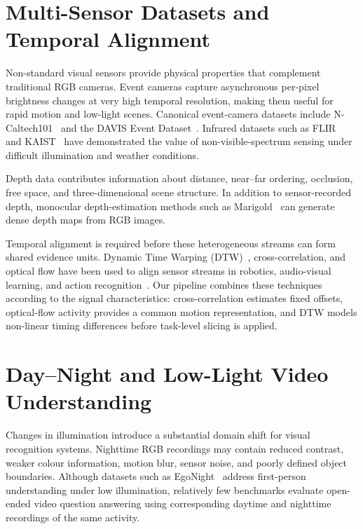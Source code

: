 \section{Multi-Sensor Datasets and Temporal Alignment}
\label{sec:rw_multisensor}

Non-standard visual sensors provide physical properties that complement
traditional RGB cameras. Event cameras capture asynchronous per-pixel brightness
changes at very high temporal resolution, making them useful for rapid motion
and low-light scenes. Canonical event-camera datasets include
N-Caltech101~\cite{orchard2015converting} and the DAVIS Event
Dataset~\cite{mueggler2017event}. Infrared datasets such as
FLIR~\cite{flir2019adas} and KAIST~\cite{hwang2015multispectral} have
demonstrated the value of non-visible-spectrum sensing under difficult
illumination and weather conditions.

Depth data contributes information about distance, near--far ordering,
occlusion, free space, and three-dimensional scene structure. In addition to
sensor-recorded depth, monocular depth-estimation methods such as
Marigold~\cite{ke2024repurposing} can generate dense depth maps from RGB
images.

Temporal alignment is required before these heterogeneous streams can form
shared evidence units. Dynamic Time Warping
(DTW)~\cite{berndt1994using}, cross-correlation, and optical flow have been
used to align sensor streams in robotics, audio-visual learning, and action
recognition~\cite{arandjelovic2017look}. Our pipeline combines these techniques
according to the signal characteristics: cross-correlation estimates fixed
offsets, optical-flow activity provides a common motion representation, and DTW
models non-linear timing differences before task-level slicing is applied.


\section{Day--Night and Low-Light Video Understanding}
\label{sec:rw_day_night}

Changes in illumination introduce a substantial domain shift for visual
recognition systems. Nighttime RGB recordings may contain reduced contrast,
weaker colour information, motion blur, sensor noise, and poorly defined object
boundaries. Although datasets such as EgoNight~\cite{egonight2024} address
first-person understanding under low illumination, relatively few benchmarks
evaluate open-ended video question answering using corresponding daytime and
nighttime recordings of the same activity.

